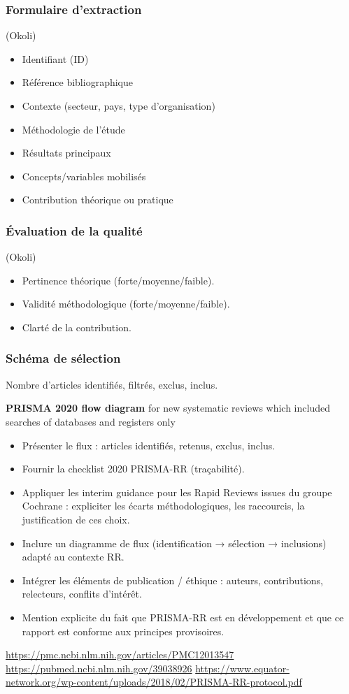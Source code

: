 \documentclass[a4paper,12pt]{article}
\begin{document}
\subsubsection{Formulaire d’extraction}
\label{sec:orgf97e483}
(Okoli)
\begin{itemize}
\item Identifiant (ID)
\item Référence bibliographique
\item Contexte (secteur, pays, type d’organisation)
\item Méthodologie de l’étude
\item Résultats principaux
\item Concepts/variables mobilisés
\item Contribution théorique ou pratique
\end{itemize}
\subsubsection{Évaluation de la qualité}
\label{sec:org0ecfce2}
(Okoli)
\begin{itemize}
\item Pertinence théorique (forte/moyenne/faible).
\item Validité méthodologique (forte/moyenne/faible).
\item Clarté de la contribution.
\end{itemize}
\subsubsection{Schéma de sélection}
\label{sec:org19f19e3}
Nombre d’articles identifiés, filtrés, exclus, inclus.

\textbf{PRISMA 2020 flow diagram} for new systematic reviews which included searches of databases and registers only
\begin{itemize}
\item Présenter le flux : articles identifiés, retenus, exclus, inclus.
\item Fournir la checklist 2020 PRISMA-RR (traçabilité).
\item Appliquer les interim guidance pour les Rapid Reviews issues du groupe Cochrane : expliciter les écarts méthodologiques, les raccourcis, la justification de ces choix.
\item Inclure un diagramme de flux (identification → sélection → inclusions) adapté au contexte RR.
\item Intégrer les éléments de publication / éthique : auteurs, contributions, relecteurs, conflits d’intérêt.
\item Mention explicite du fait que PRISMA-RR est en développement et que ce rapport est conforme aux principes provisoires.
\end{itemize}
\url{https://pmc.ncbi.nlm.nih.gov/articles/PMC12013547}
\url{https://pubmed.ncbi.nlm.nih.gov/39038926}
\url{https://www.equator-network.org/wp-content/uploads/2018/02/PRISMA-RR-protocol.pdf}
\end{document}
